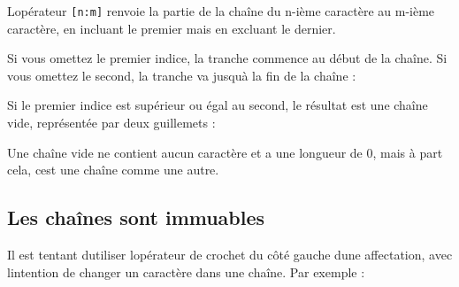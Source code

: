 L\textquotesingle opérateur \texttt{{[}n:m{]}} renvoie la partie de la
chaîne du n-ième caractère au m-ième caractère, en incluant le premier
mais en excluant le dernier.

Si vous omettez le premier indice, la tranche commence au début de la
chaîne. Si vous omettez le second, la tranche va jusqu\textquotesingle à
la fin de la chaîne :

\begin{Shaded}
\begin{Highlighting}[]
\OperatorTok{\textgreater{}\textgreater{}\textgreater{}}\OperatorTok{=} 
\OperatorTok{\textgreater{}\textgreater{}\textgreater{}}\NormalTok{ fruit[:}\NormalTok{]}
\OperatorTok{\textgreater{}\textgreater{}\textgreater{}}\NormalTok{ fruit[}\NormalTok{:]}
\end{Highlighting}
\end{Shaded}

Si le premier indice est supérieur ou égal au second, le résultat est
une chaîne vide, représentée par deux guillemets :

\begin{Shaded}
\begin{Highlighting}[]
\OperatorTok{\textgreater{}\textgreater{}\textgreater{}}\NormalTok{ fruit[}\NormalTok{:}\NormalTok{]}
\CommentTok{\textquotesingle{}\textquotesingle{}}
\end{Highlighting}
\end{Shaded}

Une chaîne vide ne contient aucun caractère et a une longueur de 0, mais
à part cela, c\textquotesingle est une chaîne comme une autre.

\hypertarget{les-chauxeenes-sont-immuables}{%
\subsection{Les chaînes sont
immuables}\label{les-chauxeenes-sont-immuables}}

Il est tentant d\textquotesingle utiliser l\textquotesingle opérateur de
crochet du côté gauche d\textquotesingle une affectation, avec
l\textquotesingle intention de changer un caractère dans une chaîne. Par
exemple :

\begin{Shaded}
\begin{Highlighting}[]
\OperatorTok{\textgreater{}\textgreater{}\textgreater{}}\OperatorTok{=} 
\OperatorTok{\textgreater{}\textgreater{}\textgreater{}}\NormalTok{ salut[}\NormalTok{] }\OperatorTok{=} 
\NormalTok{: } 
\end{Highlighting}
\end{Shaded}

